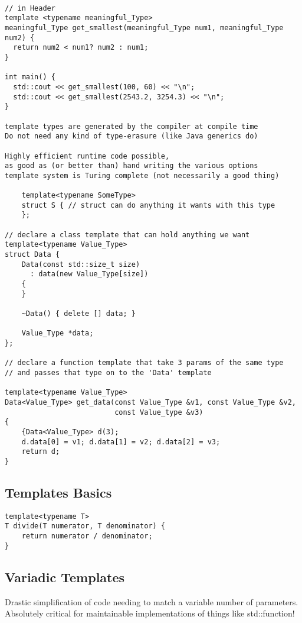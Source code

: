 \begin{verbatim}

// in Header
template <typename meaningful_Type>
meaningful_Type get_smallest(meaningful_Type num1, meaningful_Type num2) {
  return num2 < num1? num2 : num1;
}

int main() {
  std::cout << get_smallest(100, 60) << "\n";
  std::cout << get_smallest(2543.2, 3254.3) << "\n";
}

template types are generated by the compiler at compile time
Do not need any kind of type-erasure (like Java generics do)

Highly efficient runtime code possible, 
as good as (or better than) hand writing the various options
template system is Turing complete (not necessarily a good thing)

    template<typename SomeType>
    struct S { // struct can do anything it wants with this type
    };

// declare a class template that can hold anything we want
template<typename Value_Type>
struct Data {
    Data(const std::size_t size)
      : data(new Value_Type[size])
    {
    }

    ~Data() { delete [] data; }

    Value_Type *data;
};

// declare a function template that take 3 params of the same type
// and passes that type on to the 'Data' template

template<typename Value_Type>
Data<Value_Type> get_data(const Value_Type &v1, const Value_Type &v2,
                          const Value_type &v3)
{
    {Data<Value_Type> d(3);
    d.data[0] = v1; d.data[1] = v2; d.data[2] = v3;
    return d;
}
\end{verbatim}

\subsection{Templates Basics}

\begin{verbatim}
template<typename T>
T divide(T numerator, T denominator) {
    return numerator / denominator;
}
\end{verbatim}

\subsection{Variadic Templates}

Drastic simplification of code needing to match a variable number of parameters.
Absolutely critical for maintainable implementations of things like std::function!

